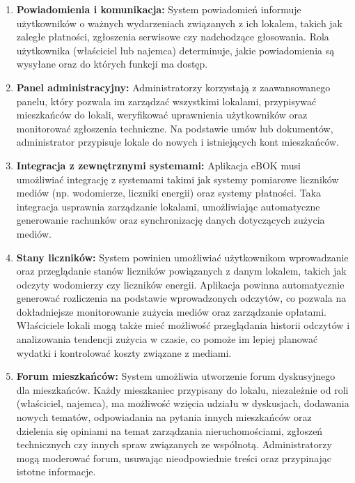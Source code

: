 \begin{enumerate}[label=\arabic*.]
	\item \textbf{Powiadomienia i komunikacja:} System powiadomień informuje użytkowników o ważnych wydarzeniach związanych z ich lokalem, takich jak zaległe płatności, zgłoszenia serwisowe czy nadchodzące głosowania. Rola użytkownika (właściciel lub najemca) determinuje, jakie powiadomienia są wysyłane oraz do których funkcji ma dostęp.

	\item \textbf{Panel administracyjny:} Administratorzy korzystają z zaawansowanego panelu, który pozwala im zarządzać wszystkimi lokalami, przypisywać mieszkańców do lokali, weryfikować uprawnienia użytkowników oraz monitorować zgłoszenia techniczne. Na podstawie umów lub dokumentów, administrator przypisuje lokale do nowych i istniejących kont mieszkańców.

	\item \textbf{Integracja z zewnętrznymi systemami:} Aplikacja eBOK musi umożliwiać integrację z systemami takimi jak systemy pomiarowe liczników mediów (np. wodomierze, liczniki energii) oraz systemy płatności. Taka integracja usprawnia zarządzanie lokalami, umożliwiając automatyczne generowanie rachunków oraz synchronizację danych dotyczących zużycia mediów.

	\item \textbf{Stany liczników:} System powinien umożliwiać użytkownikom wprowadzanie oraz przeglądanie stanów liczników powiązanych z danym lokalem, takich jak odczyty wodomierzy czy liczników energii. Aplikacja powinna automatycznie generować rozliczenia na podstawie wprowadzonych odczytów, co pozwala na dokładniejsze monitorowanie zużycia mediów oraz zarządzanie opłatami. Właściciele lokali mogą także mieć możliwość przeglądania historii odczytów i analizowania tendencji zużycia w czasie, co pomoże im lepiej planować wydatki i kontrolować koszty związane z mediami.
	
	\item \textbf{Forum mieszkańców:} System umożliwia utworzenie forum dyskusyjnego dla mieszkańców. Każdy mieszkaniec przypisany do lokalu, niezależnie od roli (właściciel, najemca), ma możliwość wzięcia udziału w dyskusjach, dodawania nowych tematów, odpowiadania na pytania innych mieszkańców oraz dzielenia się opiniami na temat zarządzania nieruchomościami, zgłoszeń technicznych czy innych spraw związanych ze wspólnotą. Administratorzy mogą moderować forum, usuwając nieodpowiednie treści oraz przypinając istotne informacje.


\end{enumerate}


